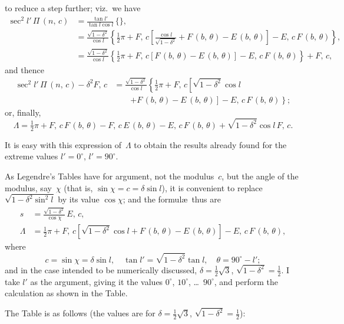 \documentclass[11pt,a4paper]{article}
\theoremstyle{plain}
\theoremstyle{definition}
\begin{document}
to reduce a step further; viz.\ we have
\begin{align*}
\sec^2 l'\,\Pi\,(n,\,c)
&= \frac{\tan l'}{\tan l\cos l}\,\{\}, \\
&= \frac{\sqrt{1-\delta^2}}{\cos l}
\left\{\tfrac{1}{2}\pi + F,\,c\left[\frac{\cos l}{\sqrt{1-\delta^2}}
+ F\,(b,\,\theta) - E\,(b,\,\theta)\right] - E,\,c\,F\,(b,\,\theta)\right\}, \\
&= \frac{\sqrt{1-\delta^2}}{\cos l}
\left\{\tfrac{1}{2}\pi + F,\,c\left[F\,(b,\,\theta) - E\,(b,\,\theta)\right]
- E,\,c\,F\,(b,\,\theta)\right\} + F,\,c,
\end{align*}
and thence
\begin{align*}
\sec^2 l'\,\Pi\,(n,\,c) - \delta^2F,\,c
&= \frac{\sqrt{1-\delta^2}}{\cos l}
\left\{\tfrac{1}{2}\pi + F,\,c\left[\sqrt{1-\delta^2}\cos l
\right.
\right. \\
&\qquad\left.\left. + F\,(b,\,\theta) - E\,(b,\,\theta)\right]
- E,\,c\,F\,(b,\,\theta)\right\};
\end{align*}
or, finally,
\[
\Lambda = \tfrac{1}{2}\pi + F,\,c\,F\,(b,\,\theta) - F,\,c\,E\,(b,\,\theta)
- E,\,c\,F\,(b,\,\theta) + \sqrt{1-\delta^2}\cos l\,F,\,c.
\]

It is easy with this expression of~$\Lambda$ to obtain the results already found for the
extreme values $l'= 0^\circ$, $l'= 90^\circ$.

As Legendre's Tables have for argument, not the modulus~$c$, but the angle of the
modulus, say~$\chi$ (that is, $\sin\chi = c = \delta\sin l$), it is convenient to replace
$\sqrt{1-\delta^2\sin^2 l}$ by its value $\cos\chi$; and the formul\ae\ thus are
\begin{align*}
s &= \frac{\sqrt{1-\delta^2}}{\cos\chi}\,E,\,c, \\
\Lambda &= \tfrac{1}{2}\pi + F,\,c\left[\sqrt{1-\delta^2}\cos l
+ F\,(b,\,\theta) - E\,(b,\,\theta)\right] - E,\,c\,F\,(b,\,\theta),
\end{align*}
where
\[
c = \sin\chi = \delta\sin l, \quad
\tan l' = \sqrt{1-\delta^2}\tan l, \quad
\theta = 90^\circ - l';
\]
and in the case intended to be numerically discussed, $\delta = \tfrac{1}{2}\sqrt{3}$,
$\sqrt{1-\delta^2} = \tfrac{1}{2}$.  I take $l'$ as the argument, giving it the values  $0^\circ$, $10^\circ$, \dots\  $90^\circ$,
and perform the calculation as shown in the Table.

\clearpage

The Table is as follows (the values are for $\delta = \tfrac{1}{2}\sqrt{3}$, $\sqrt{1-\delta^2} = \tfrac{1}{2}$):
\end{document}
